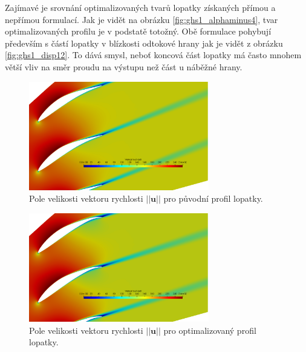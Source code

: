 Zajímavé je srovnání optimalizovaných tvarů lopatky získaných přímou a nepřímou formulací. Jak je vidět na obrázku \ref{fig:ghs1_alphaminus4}, tvar optimalizovaných profilu je v podstatě totožný. Obě formulace pohybují především s částí lopatky v blízkosti odtokové hrany jak je vidět z obrázku \ref{fig:ghs1_disp12}. To dává smysl, neboť koncová část lopatky má často mnohem větší vliv na směr proudu na výstupu než část u náběžné hrany.
\begin{figure}[h]
	\includegraphics[width=0.7\textwidth]{img/magU_0.png}
	\caption[Velikost rychlosti pro původní lopatku]{Pole velikosti vektoru rychlosti $ ||\mathbf{u}|| $ pro původní profil lopatky.}
	\label{fig:ghs1_U0}
\end{figure}
\begin{figure}[h]
	\includegraphics[width=0.7\textwidth]{img/magU_12.png}
	\caption[Velikost rychlosti pro optimalizovanou lopatku]{Pole velikosti vektoru rychlosti $ ||\mathbf{u}|| $ pro optimalizovaný profil lopatky.}
	\label{fig:ghs1_U12}
\end{figure}

